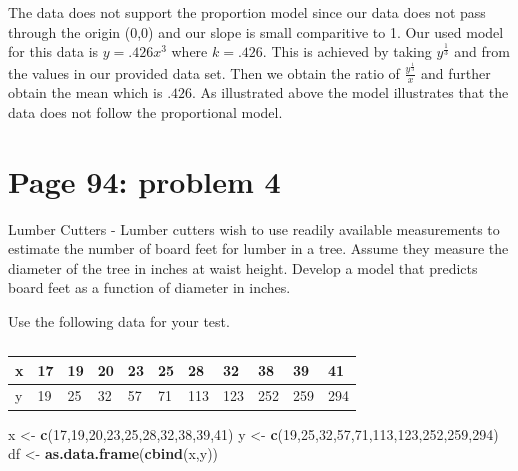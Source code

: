 \documentclass[]{article}
\newenvironment{Shaded}{\begin{snugshade}}{\end{snugshade}}
\newcommand{\KeywordTok}[1]{\textcolor[rgb]{0.13,0.29,0.53}{\textbf{{#1}}}}
\newcommand{\DecValTok}[1]{\textcolor[rgb]{0.00,0.00,0.81}{{#1}}}
\newcommand{\StringTok}[1]{\textcolor[rgb]{0.31,0.60,0.02}{{#1}}}
\newcommand{\NormalTok}[1]{{#1}}
\begin{document}
The data does not support the proportion model since our data does not
pass through the origin (0,0) and our slope is small comparitive to 1.
Our used model for this data is \(y = .426x^3\) where \(k = .426\). This
is achieved by taking \(y^\frac{1}{3}\) and from the values in our
provided data set. Then we obtain the ratio of
\(\frac{y^\frac{1}{3}}{x}\) and further obtain the mean which is
\(.426\). As illustrated above the model illustrates that the data does
not follow the proportional model.

\section{Page 94: problem 4}\label{page-94-problem-4}

Lumber Cutters - Lumber cutters wish to use readily available
measurements to estimate the number of board feet for lumber in a tree.
Assume they measure the diameter of the tree in inches at waist height.
Develop a model that predicts board feet as a function of diameter in
inches.

Use the following data for your test.

\begin{table}[!htbp]
\centering
\caption{}
\label{my-label}
\begin{tabular}{l|llllllllll}
x & 17 & 19 & 20 & 23 & 25 & 28 & 32 & 38 & 39 & 41 \\ \hline
y & 19 & 25 & 32 & 57 & 71 & 113 & 123 & 252 & 259 & 294
\end{tabular}
\end{table}

\begin{Shaded}
\begin{Highlighting}[]
\NormalTok{x <-}\StringTok{ }\KeywordTok{c}\NormalTok{(}\DecValTok{17}\NormalTok{,}\DecValTok{19}\NormalTok{,}\DecValTok{20}\NormalTok{,}\DecValTok{23}\NormalTok{,}\DecValTok{25}\NormalTok{,}\DecValTok{28}\NormalTok{,}\DecValTok{32}\NormalTok{,}\DecValTok{38}\NormalTok{,}\DecValTok{39}\NormalTok{,}\DecValTok{41}\NormalTok{)}
\NormalTok{y <-}\StringTok{ }\KeywordTok{c}\NormalTok{(}\DecValTok{19}\NormalTok{,}\DecValTok{25}\NormalTok{,}\DecValTok{32}\NormalTok{,}\DecValTok{57}\NormalTok{,}\DecValTok{71}\NormalTok{,}\DecValTok{113}\NormalTok{,}\DecValTok{123}\NormalTok{,}\DecValTok{252}\NormalTok{,}\DecValTok{259}\NormalTok{,}\DecValTok{294}\NormalTok{)}
\NormalTok{df <-}\StringTok{ }\KeywordTok{as.data.frame}\NormalTok{(}\KeywordTok{cbind}\NormalTok{(x,y))}
\end{Highlighting}
\end{Shaded}
\end{document}

